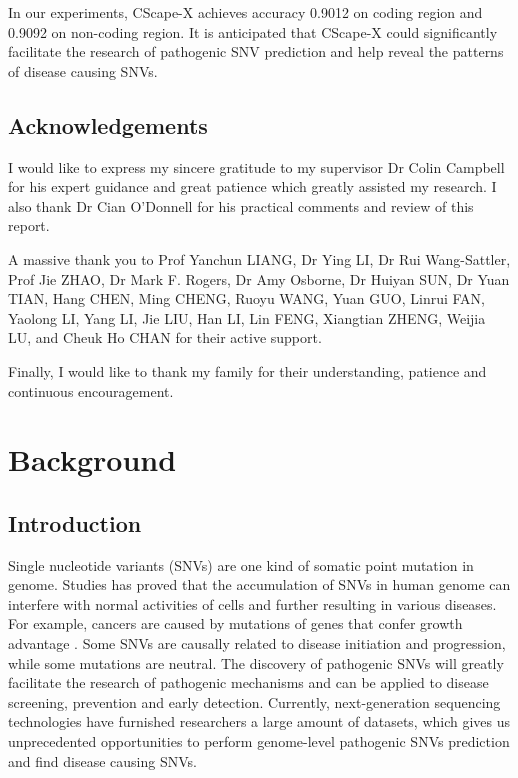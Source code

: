 \documentclass[a4paper,nohyper,nobib,openany,justified]{tufte-book}
\begin{document}
\begin{fullwidth}
In our experiments, CScape-X achieves accuracy 0.9012 on coding region and 0.9092 on non-coding region. It is anticipated that CScape-X could significantly facilitate the research of pathogenic SNV prediction and help reveal the patterns of disease causing SNVs.


\clearpage
\chapter*{Acknowledgements}

I would like to express my sincere gratitude to my supervisor Dr Colin Campbell for his expert guidance and great patience which greatly assisted my research. I also thank Dr Cian O'Donnell for his practical comments and review of this report.

A massive thank you to Prof Yanchun LIANG, Dr Ying LI, Dr Rui Wang-Sattler, Prof Jie ZHAO, Dr Mark F. Rogers, Dr Amy Osborne, Dr Huiyan SUN, Dr Yuan TIAN, Hang CHEN, Ming CHENG, Ruoyu WANG, Yuan GUO, Linrui FAN, Yaolong LI, Yang LI, Jie LIU, Han LI, Lin FENG, Xiangtian ZHENG, Weijia LU, and Cheuk Ho CHAN for their active support.

Finally, I would like to thank my family for their understanding, patience and continuous encouragement.
\tableofcontents
\mainmatter
\part{Background}
\chapter{Introduction}

Single nucleotide variants (SNVs) are one kind of somatic point mutation in genome. Studies has proved that the accumulation of SNVs in human genome can interfere with normal activities of cells and further resulting in various diseases. For example, cancers are caused by mutations of genes that confer growth advantage \cite{Greenman2007}. Some SNVs are causally related to disease initiation and progression, while some mutations are neutral. The discovery of pathogenic SNVs will greatly facilitate the research of pathogenic mechanisms and can be applied to disease screening, prevention and early detection. Currently, next-generation sequencing technologies have furnished researchers a large amount of datasets, which gives us unprecedented opportunities to perform genome-level pathogenic SNVs prediction and find disease causing SNVs.


\end{fullwidth}
\end{document}

